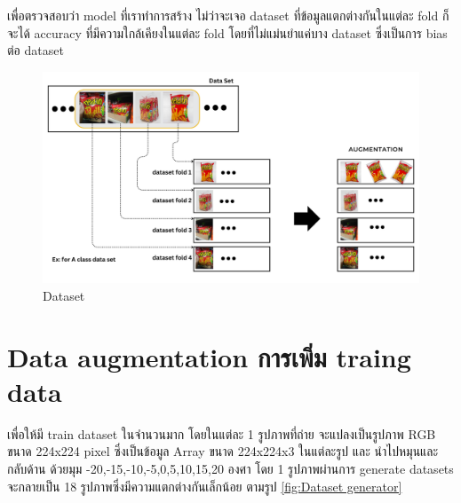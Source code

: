 เพื่อตรวจสอบว่า model ที่เราทำการสร้าง ไม่ว่าจะเจอ dataset ที่ข้อมูลแตกต่างกันในแต่ละ fold ก็จะได้ accuracy ที่มีความใกล้เคียงในแต่ละ fold โดยที่ไม่แม่นยำแค่บาง dataset ซึ่งเป็นการ bias ต่อ dataset
 
\begin{figure}[h]
  \begin{center}
   
  \includegraphics[scale=0.4]{pic/model/fold_aug.png}
  \end{center}
  
  \caption[Dataset]{Dataset}
  \label{fig:Dataset}
  \end{figure}

  \newpage



\section{Data augmentation การเพิ่ม traing data}
เพื่อให้มี train dataset ในจำนวนมาก  
โดยในแต่ละ 1 รูปภาพที่ถ่าย จะแปลงเป็นรูปภาพ RGB ขนาด 224x224 pixel ซึ่งเป็นข้อมูล Array ขนาด 224x224x3 ในแต่ละรูป
และ   นำไปหมุนและกลับด้าน ด้วยมุม -20,-15,-10,-5,0,5,10,15,20 องศา
โดย 1 รูปภาพผ่านการ generate datasets จะกลายเป็น 18 รูปภาพซึ่งมีความแตกต่างกันเล็กน้อย ตามรูป \ref{fig:Dataset generator}

